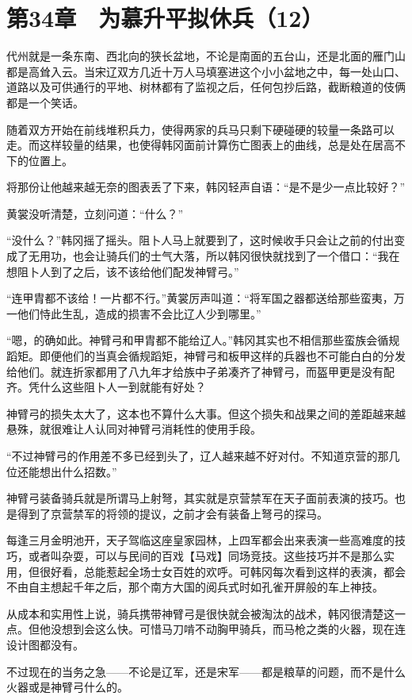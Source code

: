 \section{第34章　为慕升平拟休兵（12）}

代州就是一条东南、西北向的狭长盆地，不论是南面的五台山，还是北面的雁门山都是高耸入云。当宋辽双方几近十万人马填塞进这个小小盆地之中，每一处山口、道路以及可供通行的平地、树林都有了监视之后，任何包抄后路，截断粮道的伎俩都是一个笑话。

随着双方开始在前线堆积兵力，使得两家的兵马只剩下硬碰硬的较量一条路可以走。而这样较量的结果，也使得韩冈面前计算伤亡图表上的曲线，总是处在居高不下的位置上。

将那份让他越来越无奈的图表丢了下来，韩冈轻声自语：“是不是少一点比较好？”

黄裳没听清楚，立刻问道：“什么？”

“没什么？”韩冈摇了摇头。阻卜人马上就要到了，这时候收手只会让之前的付出变成了无用功，也会让骑兵们的士气大落，所以韩冈很快就找到了一个借口：“我在想阻卜人到了之后，该不该给他们配发神臂弓。”

“连甲胄都不该给！一片都不行。”黄裳厉声叫道：“将军国之器都送给那些蛮夷，万一他们恃此生乱，造成的损害不会比辽人少到哪里。”

“嗯，的确如此。神臂弓和甲胄都不能给辽人。”韩冈其实也不相信那些蛮族会循规蹈矩。即便他们的当真会循规蹈矩，神臂弓和板甲这样的兵器也不可能白白的分发给他们。就连折家都用了八九年才给族中子弟凑齐了神臂弓，而盔甲更是没有配齐。凭什么这些阻卜人一到就能有好处？

神臂弓的损失太大了，这本也不算什么大事。但这个损失和战果之间的差距越来越悬殊，就很难让人认同对神臂弓消耗性的使用手段。

“不过神臂弓的作用差不多已经到头了，辽人越来越不好对付。不知道京营的那几位还能想出什么招数。”

神臂弓装备骑兵就是所谓马上射弩，其实就是京营禁军在天子面前表演的技巧。也是得到了京营禁军的将领的提议，之前才会有装备上弩弓的探马。

每逢三月金明池开，天子驾临这座皇家园林，上四军都会出来表演一些高难度的技巧，或者叫杂耍，可以与民间的百戏【马戏】同场竞技。这些技巧并不是那么实用，但很好看，总能惹起全场士女百姓的欢呼。可韩冈每次看到这样的表演，都会不由自主想起千年之后，那个南方大国的阅兵式时如孔雀开屏般的车上神技。

从成本和实用性上说，骑兵携带神臂弓是很快就会被淘汰的战术，韩冈很清楚这一点。但他没想到会这么快。可惜马刀啃不动胸甲骑兵，而马枪之类的火器，现在连设计图都没有。

不过现在的当务之急——不论是辽军，还是宋军——都是粮草的问题，而不是什么火器或是神臂弓什么的。

